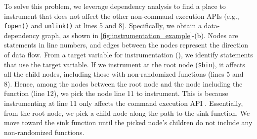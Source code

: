 To solve this problem, we leverage dependency analysis to find a place to instrument that does not affect the other non-command execution APIs (e.g., {\tt fopen()} and {\tt unlink()} at lines 5 and 8).
Specifically, we obtain a data-dependency graph, as shown in \autoref{fig:instrumentation_example}-(b). Nodes are statements in line numbers, and edges between the nodes represent the direction of data flow. From a target variable for instrumentation (), we identify statements that use the target variable.
If we instrument at the root node ({\tt \$bin}), it affects all the child nodes, including those with non-randomized functions (lines 5 and 8).
Hence, among the nodes between the root node and the node including the  function (line 12), we pick the node line 11 to instrument.
This is because instrumenting at line 11 only affects the command execution API .
Essentially, from the root node, we pick a child node along the path to the sink function. We move toward the sink function until the picked node's children do not include any non-randomized functions.



